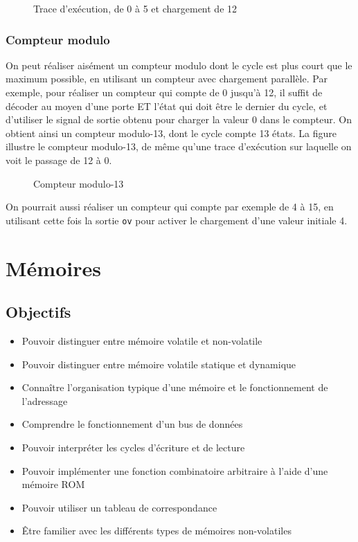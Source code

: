 \documentclass[11pt]{article}
\begin{document}
\begin{figure}[htbp]
\centering

\caption{\label{fig:org3a10c92}Trace d'exécution, de 0 à 5 et chargement de 12}
\end{figure}

\subsubsection{Compteur modulo}
\label{sec:org7e2b109}

On peut réaliser aisément un compteur modulo dont le cycle est plus
court que le maximum possible, en utilisant un compteur avec
chargement parallèle.  Par exemple, pour réaliser un compteur qui
compte de 0 jusqu'à 12, il suffit de décoder au moyen d'une porte ET
l'état qui doit être le dernier du cycle, et d'utiliser le signal de
sortie obtenu pour charger la valeur 0 dans le compteur. On obtient
ainsi un compteur modulo-13, dont le cycle compte 13 états.  La figure
illustre le compteur modulo-13, de même qu'une trace d'exécution sur
laquelle on voit le passage de 12 à 0.

\begin{figure}[htbp]
\centering

\caption{\label{fig:orgf073d26}Compteur modulo-13}
\end{figure}

On pourrait aussi réaliser un compteur qui compte par exemple de 4 à
15, en utilisant cette fois la sortie \texttt{ov} pour activer le chargement
d'une valeur initiale 4.

\section{Mémoires}
\label{sec:org6bfa284}
\subsection{Objectifs}
\label{sec:org6c1efd4}
\begin{itemize}
\item Pouvoir distinguer entre mémoire volatile et non-volatile
\item Pouvoir distinguer entre mémoire volatile statique et dynamique
\item Connaître l'organisation typique d'une mémoire et le fonctionnement
de l'adressage
\item Comprendre le fonctionnement d'un bus de données
\item Pouvoir interpréter les cycles d'écriture et de lecture
\item Pouvoir implémenter une fonction combinatoire arbitraire à l'aide d'une
mémoire ROM
\item Pouvoir utiliser un tableau de correspondance
\item Être familier avec les différents types de mémoires non-volatiles
\end{itemize}
\end{document}
